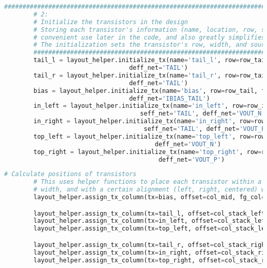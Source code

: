 \clearpage
\begin{lstlisting}[language=Python, caption=Assigning transistors to a row and initializing, label={lst:tx_init}, float]
	################################################################################
        # 2:
        # Initialize the transistors in the design
        # Storing each transistor's information (name, location, row, size, etc) in a dictionary object allows for
        # convenient use later in the code, and also greatly simplifies the schematic generation
        # The initialization sets the transistor's row, width, and source/drain net names for proper dummy creation
        ################################################################################
        tail_l = layout_helper.initialize_tx(name='tail_l', row=row_tail, fg_spec='bottom_tail',
                                  deff_net='TAIL')
        tail_r = layout_helper.initialize_tx(name='tail_r', row=row_tail, fg_spec='bottom_tail',
                                  deff_net='TAIL')
        bias = layout_helper.initialize_tx(name='bias', row=row_tail, fg_spec='bottom_bias',
                                  deff_net='IBIAS_TAIL')
        in_left = layout_helper.initialize_tx(name='in_left', row=row_input, fg_spec='bottom_in',
                                     seff_net='TAIL', deff_net='VOUT_N')
        in_right = layout_helper.initialize_tx(name='in_right', row=row_input, fg_spec='bottom_in',
                                      seff_net='TAIL', deff_net='VOUT_P')
        top_left = layout_helper.initialize_tx(name='top_left', row=row_mirror, fg_spec='top',
                                         deff_net='VOUT_N')
        top_right = layout_helper.initialize_tx(name='top_right', row=row_mirror, fg_spec='top',
                                          deff_net='VOUT_P')
\end{lstlisting}
\clearpage
\begin{lstlisting}[language=Python, caption=Assigning transistors to columns, label={lst:col_assign}, float]
	# Calculate positions of transistors
        # This uses helper functions to place each transistor within a stack/column of a specified starting index and
        # width, and with a certain alignment (left, right, centered) within that column
        layout_helper.assign_tx_column(tx=bias, offset=col_mid, fg_col=fg_mid, align=0)

        layout_helper.assign_tx_column(tx=tail_l, offset=col_stack_left, fg_col=fg_stack, align=0)
        layout_helper.assign_tx_column(tx=in_left, offset=col_stack_left, fg_col=fg_stack, align=0)
        layout_helper.assign_tx_column(tx=top_left, offset=col_stack_left, fg_col=fg_stack, align=0)

        layout_helper.assign_tx_column(tx=tail_r, offset=col_stack_right, fg_col=fg_stack, align=0)
        layout_helper.assign_tx_column(tx=in_right, offset=col_stack_right, fg_col=fg_stack, align=0)
        layout_helper.assign_tx_column(tx=top_right, offset=col_stack_right, fg_col=fg_stack, align=0)
\end{lstlisting}
